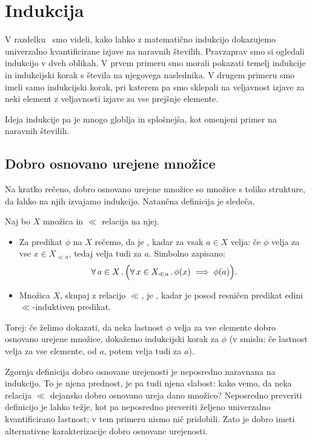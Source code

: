 \chapter{Indukcija}


V razdelku~ smo videli, kako lahko z matematično indukcijo dokazujemo univerzalno kvantificirane izjave na naravnih številih. Pravzaprav smo si ogledali indukcijo v dveh oblikah. V prvem primeru smo morali pokazati temelj indukcije in indukcijski korak s števila na njegovega naslednika. V drugem primeru smo imeli samo indukcijski korak, pri katerem pa smo sklepali na veljavnost izjave za neki element z veljavnosti izjave za vse prejšnje elemente.

Ideja indukcije pa je mnogo globlja in splošnejša, kot omenjeni primer na naravnih številih.

\section{Dobro osnovano urejene množice}

Na kratko rečeno, dobro osnovano urejene množice so množice s toliko strukture, da lahko na njih izvajamo indukcijo. Natančna definicija je sledeča.

\begin{definicija}
	Naj bo $X$ množica in $\ll$ relacija na njej.
	\begin{itemize}
		\item
			Za predikat $\phi$ na $X$ rečemo, da je , kadar za vsak $a \in X$ velja: če $\phi$ velja za vse $x \in X_{\ll a}$, tedaj velja tudi za $a$. Simbolno zapisano:
			\[\all[2]{a}[X]{\xall{x}[X_{\ll a}]{\phi(x)} \implies \phi(a)}.\]
		\item
			Množica $X$, skupaj z relacijo $\ll$, je , kadar je posod resničen predikat edini $\ll$-induktiven predikat.
	\end{itemize}
\end{definicija}

Torej: če želimo dokazati, da neka lastnost $\phi$ velja za vse elemente dobro osnovano urejene množice, dokažemo indukcijski korak za $\phi$ (v smislu: če lastnost velja za vse elemente,  od $a$, potem velja tudi za $a$).

Zgornja definicija dobro osnovane urejenosti je neposredno naravnana na indukcijo. To je njena prednost, je pa tudi njena slabost: kako vemo, da neka relacija $\ll$ dejansko dobro osnovano ureja dano množico? Neposredno preveriti definicijo je lahko težje, kot pa neposredno preveriti željeno univerzalno kvantificirano lastnost; v tem primeru nismo nič pridobili. Zato je dobro imeti alternativne karakterizacije dobro osnovane urejenosti.

